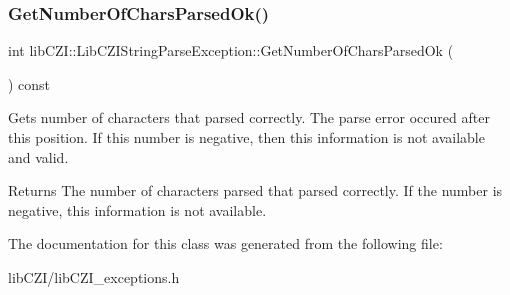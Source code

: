 \subsubsection{\texorpdfstring{Get\+Number\+Of\+Chars\+Parsed\+Ok()}{GetNumberOfCharsParsedOk()}}
{\footnotesize\ttfamily int lib\+C\+Z\+I\+::\+Lib\+C\+Z\+I\+String\+Parse\+Exception\+::\+Get\+Number\+Of\+Chars\+Parsed\+Ok (\begin{DoxyParamCaption}{ }\end{DoxyParamCaption}) const\hspace{0.3cm}{\ttfamily [inline]}}

Gets number of characters that parsed correctly. The parse error occured after this position. If this number is negative, then this information is not available and valid. \begin{DoxyReturn}{Returns}
The number of characters parsed that parsed correctly. If the number is negative, this information is not available. 
\end{DoxyReturn}


The documentation for this class was generated from the following file\+:\begin{DoxyCompactItemize}
\item 
lib\+C\+Z\+I/lib\+C\+Z\+I\+\_\+exceptions.\+h\end{DoxyCompactItemize}
